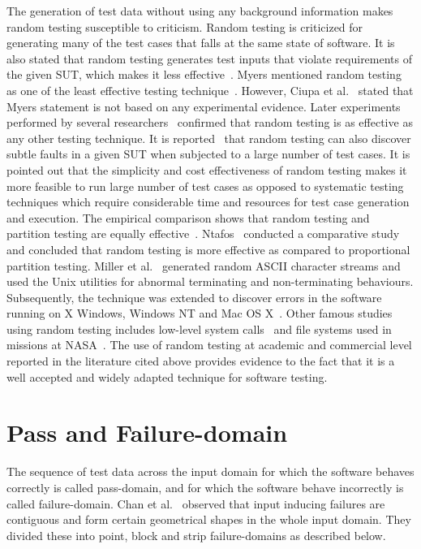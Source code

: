 The generation of test data without using any background information makes random testing susceptible to criticism. Random testing is criticized for generating many of the test cases that falls at the same state of software. It is also stated that random testing generates test inputs that violate requirements of the given SUT, which makes it less effective~\cite{pacheco2009directed, sen2007effective}. Myers mentioned random testing as one of the least effective testing technique~\cite{myers2011art}. However, Ciupa et al.~\cite{ciupa2007experimental} stated that Myers statement is not based on any experimental evidence. Later experiments performed by several researchers~\cite{ciupa2008finding, hamlet1994random,  leitner2007efficient} confirmed that random testing is as effective as any other testing technique. It is reported~\cite{duran1981report} that random testing can also discover subtle faults in a given SUT when subjected to a large number of test cases. It is pointed out that the simplicity and cost effectiveness of random testing makes it more feasible to run large number of test cases as opposed to systematic testing techniques which require considerable time and resources for test case generation and execution. The empirical comparison shows that random testing and partition testing are equally effective~\cite{hamlet1990partition}. Ntafos~\cite{ntafos1998random} conducted a comparative study and concluded that random testing is more effective as compared to proportional partition testing. Miller et al.~\cite{miller1990empirical} generated random ASCII character streams and used the Unix utilities for abnormal terminating and non-terminating behaviours. Subsequently, the technique was extended to discover errors in the software running on X Windows, Windows NT and Mac OS X~\cite{forrester2000empirical, miller2006empirical}. Other famous studies using random testing includes low-level system calls~\cite{kropp1998automated} and file systems used in missions at NASA~\cite{groce2007randomized}. The use of random testing at academic and commercial level reported in the literature cited above provides evidence to the fact that it is a well accepted and widely adapted technique for software testing.



\section{Pass and Failure-domain} \label{sec:failuredomains_2}
\label{sec:genuineandfailuredomain}
The sequence of test data across the input domain for which the software behaves correctly is called pass-domain, and for which the software behave incorrectly is called failure-domain. Chan et al.~\cite{chan1996proportional} observed that input inducing failures are contiguous and form certain geometrical shapes in the whole input domain. They divided these into point, block and strip failure-domains as described below.

